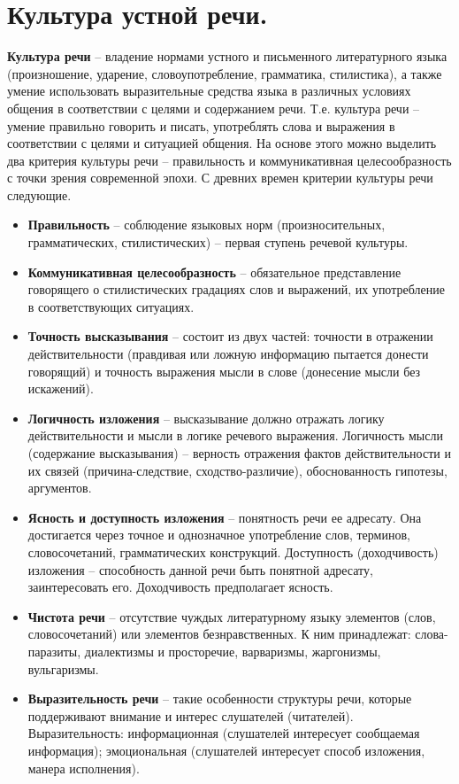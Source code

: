 \section{Культура устной речи.}

 \textbf{Культура речи} – владение нормами устного и письменного литературного языка (произношение, ударение, словоупотребление, грамматика, стилистика), а также умение использовать выразительные средства языка в различных условиях общения в соответствии с целями и содержанием речи. Т.е. культура речи – умение правильно говорить и писать, употреблять слова и выражения в соответствии с целями и ситуацией общения. На основе этого можно выделить два критерия культуры речи – правильность и коммуникативная целесообразность с точки зрения современной эпохи. С древних времен критерии культуры речи следующие.
\begin{itemize}
    \item \textbf{Правильность} – соблюдение языковых норм (произносительных, грамматических, стилистических) – первая ступень речевой культуры.
    \item \textbf{Коммуникативная целесообразность} – обязательное представление говорящего о стилистических градациях слов и выражений, их употребление в соответствующих ситуациях.
    \item \textbf{Точность высказывания} – состоит из двух частей: точности в отражении действительности (правдивая или ложную информацию пытается донести говорящий) и точность выражения мысли в слове (донесение мысли без искажений).
    \item \textbf{Логичность изложения} – высказывание должно отражать логику действительности и мысли в логике речевого выражения. Логичность мысли (содержание высказывания) – верность отражения фактов действительности и их связей (причина-следствие, сходство-различие), обоснованность гипотезы, аргументов.
    \item \textbf{Ясность и доступность изложения} – понятность речи ее адресату. Она достигается через точное и однозначное употребление слов, терминов, словосочетаний, грамматических конструкций. Доступность (доходчивость) изложения – способность данной речи быть понятной адресату, заинтересовать его. Доходчивость предполагает ясность.
    \item \textbf{Чистота речи} – отсутствие чуждых литературному языку элементов (слов, словосочетаний) или элементов безнравственных. К ним принадлежат: слова-паразиты, диалектизмы и просторечие, варваризмы, жаргонизмы, вульгаризмы.
    \item \textbf{Выразительность речи} – такие особенности структуры речи, которые поддерживают внимание и интерес слушателей (читателей). Выразительность: информационная (слушателей интересует сообщаемая информация); эмоциональная (слушателей интересует способ изложения, манера исполнения).

\end{itemize}
